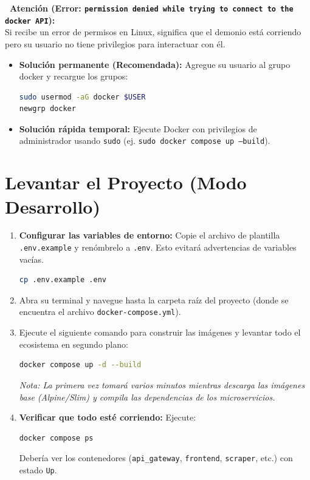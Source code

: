 \documentclass[11pt,a4paper]{article}
\begin{document}
\vspace{0.5cm}
\noindent\textbf{\textwarning\ Atención (Error: \texttt{permission denied while trying to connect to the docker API}):} \\
Si recibe un error de permisos en Linux, significa que el demonio está corriendo pero su usuario no tiene privilegios para interactuar con él.
\begin{itemize}
    \item \textbf{Solución permanente (Recomendada):} Agregue su usuario al grupo docker y recargue los grupos:
\begin{lstlisting}[language=bash]
sudo usermod -aG docker $USER
newgrp docker
\end{lstlisting}
    \item \textbf{Solución rápida temporal:} Ejecute Docker con privilegios de administrador usando \texttt{sudo} (ej. \texttt{sudo docker compose up --build}).
\end{itemize}

\section{Levantar el Proyecto (Modo Desarrollo)}

\begin{enumerate}
    \item \textbf{Configurar las variables de entorno:} Copie el archivo de plantilla \texttt{.env.example} y renómbrelo a \texttt{.env}. Esto evitará advertencias de variables vacías.
\begin{lstlisting}[language=bash]
cp .env.example .env
\end{lstlisting}
    \item Abra su terminal y navegue hasta la carpeta raíz del proyecto (donde se encuentra el archivo \texttt{docker-compose.yml}).
    \item Ejecute el siguiente comando para construir las imágenes y levantar todo el ecosistema en segundo plano:
\begin{lstlisting}[language=bash]
docker compose up -d --build
\end{lstlisting}
    \textit{Nota: La primera vez tomará varios minutos mientras descarga las imágenes base (Alpine/Slim) y compila las dependencias de los microservicios.}

    \item \textbf{Verificar que todo esté corriendo:}
    Ejecute:
\begin{lstlisting}[language=bash]
docker compose ps
\end{lstlisting}
    Debería ver los contenedores (\texttt{api\_gateway}, \texttt{frontend}, \texttt{scraper}, etc.) con estado \texttt{Up}.
\end{enumerate}
\end{document}
